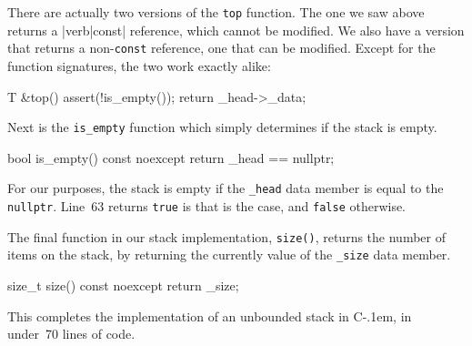 \documentclass{article}
\newcommand{\Cpp}{\mbox{C\kern-.1em\raisebox{.35ex}{\smaller{\smaller{+\kern-0.05em+}}}}}
\begin{document}
  There are actually two versions of the \verb|top| function. The one we saw above returns a |verb|const| reference, which cannot be modified. We also have a version that returns a non-\verb|const| reference, one that can be modified. Except for the function signatures, the two work exactly alike:
  \begin{lstcpp}
  T &top()
  {
    assert(!is_empty());
    return _head->_data;
  }\end{lstcpp}

  Next is the \verb|is_empty| function which simply determines if the stack is empty.
  \begin{lstcpp}
  bool is_empty() const noexcept
  {
    return _head == nullptr;
  }\end{lstcpp}
  For our purposes, the stack is empty if the \verb|_head| data member is equal to the \verb|nullptr|. Line~63 returns \verb|true| is that is the case, and \verb|false| otherwise.

  The final function in our stack implementation, \verb|size()|, returns the number of items on the stack, by returning the currently value of the \verb|_size| data member.
  \begin{lstcpp}
  size_t size() const noexcept
  {
    return _size;
  }\end{lstcpp}

  This completes the implementation of an unbounded stack in \Cpp, in under~70 lines of code.
\end{document}
